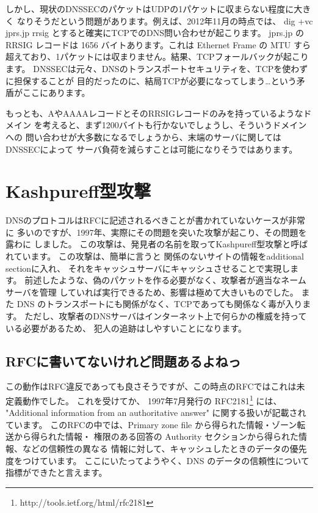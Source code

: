 しかし、現状のDNSSECのパケットはUDPの1パケットに収まらない程度に大きく
なりそうだという問題があります。例えば、2012年11月の時点では、 dig +vc jprs.jp rrsig 
とすると確実にTCPでのDNS問い合わせが起こります。
jprs.jp の RRSIG レコードは 1656 バイトあります。これは Ethernet Frame の MTU すら
超えており、1パケットには収まりません。結果、TCPフォールバックが起こります。
DNSSECは元々、DNSのトランスポートセキュリティを、TCPを使わずに担保することが
目的だったのに、結局TCPが必要になってしまう…という矛盾がここにあります。

もっとも、AやAAAAレコードとそのRRSIGレコードのみを持っているようなドメイン
を考えると、まず1200バイトも行かないでしょうし、そういうドメインへの
問い合わせが大多数になるでしょうから、末端のサーバに関してはDNSSECによって
サーバ負荷を減らすことは可能になりそうではあります。


\section{Kashpureff型攻撃}
DNSのプロトコルはRFCに記述されるべきことが書かれていないケースが非常に
多いのですが、1997年、実際にその問題を突いた攻撃が起こり、その問題を露わに
しました。
この攻撃は、発見者の名前を取ってKashpureff型攻撃と呼ばれています。
この攻撃は、簡単に言うと 関係のないサイトの情報をadditional sectionに入れ、
それをキャッシュサーバにキャッシュさせることで実現します。
前述したような、偽のパケットを作る必要がなく、攻撃者が適当なネームサーバを管理
していれば実行できるため、影響は極めて大きいものでした。
また DNS のトランスポートにも関係がなく、TCPであっても関係なく毒が入ります。
ただし、攻撃者のDNSサーバはインターネット上で何らかの権威を持っている必要があるため、
犯人の追跡はしやすいことになります。

\subsection{RFCに書いてないけれど問題あるよねっ}
この動作はRFC違反であっても良さそうですが、この時点のRFCではこれは未定義動作でした。
これを受けてか、 1997年7月発行の RFC2181\footnote{http://tools.ietf.org/html/rfc2181} には、
"Additional information from an authoritative answer" に関する扱いが記載されています。
このRFCの中では、Primary zone file から得られた情報・ゾーン転送から得られた情報・
権限のある回答の Authority セクションから得られた情報、などの信頼性の異なる
情報に対して、キャッシュしたときのデータの優先度をつけています。
ここにいたってようやく、DNS のデータの信頼性について指標ができたと言えます。

